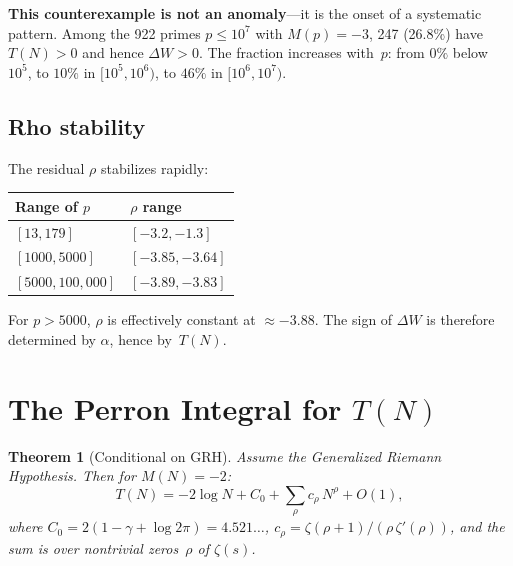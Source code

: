 \documentclass[11pt]{article}
\newtheorem{theorem}{Theorem}[section]
\theoremstyle{definition}
\begin{document}
\textbf{This counterexample is not an anomaly}---it is the onset of
a systematic pattern.  Among the 922 primes $p \le 10^7$ with
$M(p) = -3$, 247 (26.8\%) have $T(N) > 0$ and hence $\Delta W > 0$.
The fraction increases with~$p$: from $0\%$ below $10^5$, to $10\%$
in $[10^5, 10^6)$, to $46\%$ in $[10^6, 10^7)$.


\subsection{Rho stability}

The residual $\rho$ stabilizes rapidly:

\begin{center}
\begin{tabular}{ll}
\toprule
Range of $p$ & $\rho$ range \\
\midrule
$[13, 179]$ & $[-3.2, -1.3]$ \\
$[1000, 5000]$ & $[-3.85, -3.64]$ \\
$[5000, 100{,}000]$ & $[-3.89, -3.83]$ \\
\bottomrule
\end{tabular}
\end{center}

For $p > 5000$, $\rho$ is effectively constant at $\approx -3.88$.
The sign of $\Delta W$ is therefore determined by $\alpha$, hence
by~$T(N)$.



\section{The Perron Integral for $T(N)$}\label{sec:perron}

\begin{theorem}[Conditional on GRH]\label{thm:perron}
Assume the Generalized Riemann Hypothesis.  Then for $M(N) = -2$:
\begin{equation}\label{eq:perron}
  T(N) = -2\log N + C_0 + \sum_{\rho} c_\rho\, N^\rho + O(1),
\end{equation}
where $C_0 = 2(1 - \gamma + \log 2\pi) = 4.521\ldots$,
$c_\rho = \zeta(\rho+1)/(\rho\,\zeta'(\rho))$,
and the sum is over nontrivial zeros~$\rho$ of $\zeta(s)$.
\end{theorem}
\end{document}

